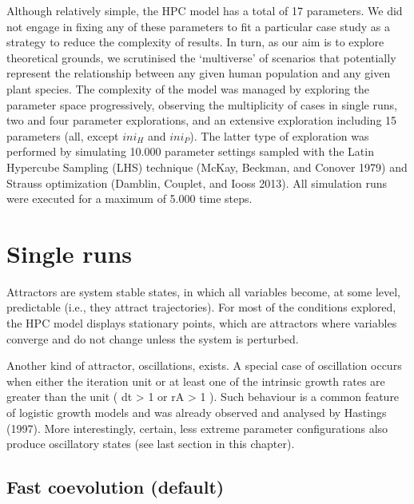 \documentclass[
]{book}
\begin{document}
Although relatively simple, the HPC model has a total of 17 parameters. We did not engage in fixing any of these parameters to fit a particular case study as a strategy to reduce the complexity of results. In turn, as our aim is to explore theoretical grounds, we scrutinised the `multiverse' of scenarios that potentially represent the relationship between any given human population and any given plant species. The complexity of the model was managed by exploring the parameter space progressively, observing the multiplicity of cases in single runs, two and four parameter explorations, and an extensive exploration including 15 parameters (all, except \(ini_H\) and \(ini_P\)). The latter type of exploration was performed by simulating 10.000 parameter settings sampled with the Latin Hypercube Sampling (LHS) technique (McKay, Beckman, and Conover 1979) and Strauss optimization (Damblin, Couplet, and Iooss 2013). All simulation runs were executed for a maximum of 5.000 time steps.

\hypertarget{single-runs}{%
\chapter{Single runs}\label{single-runs}}

Attractors are system stable states, in which all variables become, at some level, predictable (i.e., they attract trajectories). For most of the conditions explored, the HPC model displays stationary points, which are attractors where variables converge and do not change unless the system is perturbed.

Another kind of attractor, oscillations, exists. A special case of oscillation occurs when either the iteration unit or at least one of the intrinsic growth rates are greater than the unit ( dt \textgreater{} 1 or rA \textgreater{} 1 ). Such behaviour is a common feature of logistic growth models and was already observed and analysed by Hastings (1997). More interestingly, certain, less extreme parameter configurations also produce oscillatory states (see last section in this chapter).

\newpage

\hypertarget{fast-coevolution-default}{%
\section{Fast coevolution (default)}\label{fast-coevolution-default}}
\end{document}
